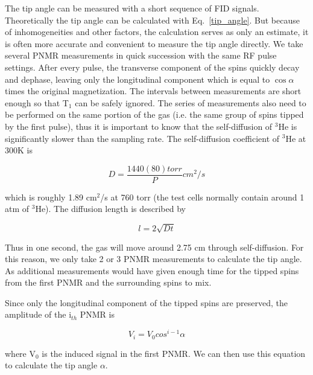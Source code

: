 The tip angle can be measured with a short sequence of FID signals. Theoretically the tip angle can be calculated with Eq.~\ref{tip_angle}. But because of inhomogeneities and other factors, the calculation serves as only an estimate, it is often more accurate and convenient to measure the tip angle directly. We take several PNMR measurements in quick succession with the same RF pulse settings. After every pulse, the transverse component of the spins quickly decay and dephase, leaving only the longitudinal component which is equal to $\cos{\alpha}$ times the original magnetization. The intervals between measurements are short enough so that T$_{1}$ can be safely ignored. The series of measurements also need to be performed on the same portion of the gas (i.e. the same group of spins tipped by the first pulse), thus it is important to know that the self-diffusion of $^{3}$He is significantly slower than the sampling rate. The self-diffusion coefficient of $^{3}$He at 300K is~\cite{J.Phys.France.35}

\begin{equation}
D=\frac{1440(80)torr}{P}cm^{2}/s
\end{equation}

which is roughly 1.89 cm$^{2}$/s at 760 torr (the test cells normally contain around 1 atm of $^{3}$He). The diffusion length is described by

\begin{equation}
l = 2\sqrt{Dt}
\end{equation}

Thus in one second, the gas will move around 2.75 cm through self-diffusion. For this reason, we only take 2 or 3 PNMR measurements to calculate the tip angle. As additional measurements would have given enough time for the tipped spins from the first PNMR and the surrounding spins to mix.

Since only the longitudinal component of the tipped spins are preserved, the amplitude of the i$_{th}$ PNMR is

\begin{equation}
V_{i}=V_{0}cos^{i-1}\alpha 
\end{equation}

where V$_{0}$ is the induced signal in the first PNMR. We can then use this equation to calculate the tip angle $\alpha$.






